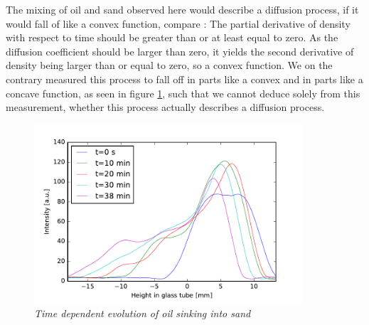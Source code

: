 The mixing of oil and sand observed here would describe a diffusion process, if it would fall of like a convex function, compare \cite[(4.24)]{diffusion}: The partial derivative of density with respect to time should be greater than or at least equal to zero. As the diffusion coefficient should be larger than zero, it yields the second derivative of density being larger than or equal to zero, so a convex function. We on the contrary measured this process to fall off in parts like a convex and in parts like a concave function, as seen in figure \ref{fig:13}, such that we cannot deduce solely from this measurement, whether this process actually describes a diffusion process.
\begin{figure}[h]
	\centering
	\includegraphics[width=100mm]{AccumulatedOilSand}
	\caption{\itshape Time dependent evolution of oil sinking into sand}
	\label{fig:13}
\end{figure}

